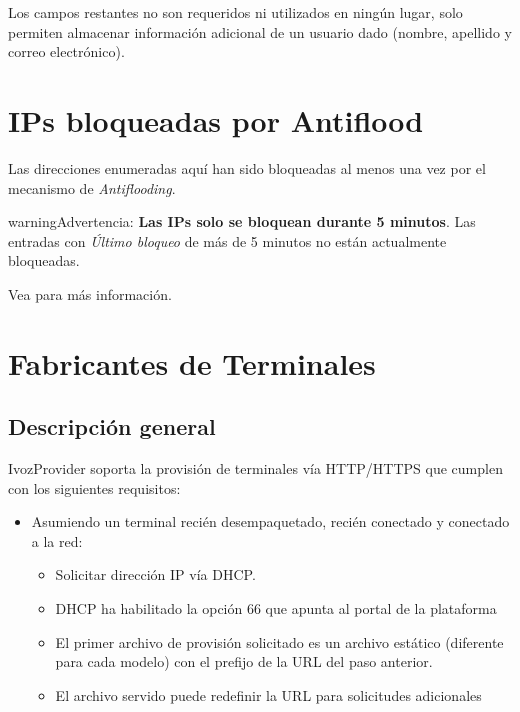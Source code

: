 \documentclass[letterpaper,10pt,spanish]{sphinxmanual}
\begin{document}
Los campos restantes no son requeridos ni utilizados en ningún lugar, solo permiten almacenar información adicional de un usuario dado (nombre, apellido y correo electrónico).


\section{IPs bloqueadas por Antiflood}
\label{administration_portal/platform/antiflood_banned_ips:antiflood-banned-ips}\label{administration_portal/platform/antiflood_banned_ips::doc}\label{administration_portal/platform/antiflood_banned_ips:id1}
Las direcciones enumeradas aquí han sido bloqueadas al menos una vez por el mecanismo de \emph{Antiflooding}.

\begin{notice}{warning}{Advertencia:}
\textbf{Las IPs solo se bloquean durante 5 minutos}. Las entradas con \emph{Último bloqueo} de más de 5 minutos no están actualmente bloqueadas.
\end{notice}

Vea {\hyperref[security_and_maintenance/security/antiflooding:sip\string-antiflooding]{}} para más información.


\section{Fabricantes de Terminales}
\label{administration_portal/platform/terminal_manufacturers:terminal-manufacturers}\label{administration_portal/platform/terminal_manufacturers::doc}\label{administration_portal/platform/terminal_manufacturers:provisioning}

\subsection{Descripción general}
\label{administration_portal/platform/terminal_manufacturers:overview}
IvozProvider soporta la provisión de terminales vía HTTP/HTTPS que cumplen con los siguientes requisitos:
\begin{itemize}
\item {} 
Asumiendo un terminal recién desempaquetado, recién conectado y conectado a la red:
\begin{itemize}
\item {} 
Solicitar dirección IP vía DHCP.

\item {} 
DHCP ha habilitado la opción 66 que apunta al portal de la plataforma

\item {} 
El primer archivo de provisión solicitado es un archivo estático (diferente para cada modelo) con el prefijo de la URL del paso anterior.

\item {} 
El archivo servido puede redefinir la URL para solicitudes adicionales

\end{itemize}

\end{itemize}
\end{document}
